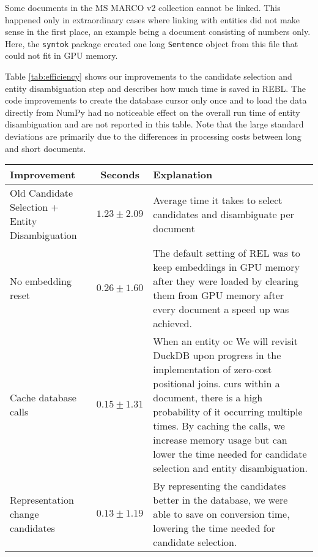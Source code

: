Some documents in the MS MARCO v2 collection cannot be linked. This happened only in extraordinary cases where linking with entities did not make sense in the first place, an example being a document consisting of numbers only. Here, the \texttt{syntok} package created one long \texttt{Sentence} object from this file that could not fit in GPU memory.

Table \ref{tab:efficiency} shows our improvements to the candidate selection and entity disambiguation step and describes how much time is saved in REBL. The code improvements to create the database cursor only once and to load the data directly from NumPy had no noticeable effect on the overall run time of entity disambiguation and are not reported in this table. Note that the large standard deviations are primarily due to the differences in processing costs between long and short documents.

\begin{sidewaystable}
	\caption{Efficiency improvements for Candidate Selection and Entity Disambiguation. Improvements are calculated over a sample of 5000 documents using a machine with an Intel Xeon Silver 4214 CPU @ 2.20GHz using two cores with 187GB RAM and a GeForce RTX 2080 Ti (11GB) GPU. Improvements are cumulative; the times shown include the previous improvement as well.}
	\label{tab:efficiency}
	\begin{tabular}{p{6cm} c p{10cm}}
		\toprule
		Improvement & Seconds & Explanation\\
		\midrule
		Old Candidate Selection + Entity Disambiguation & $1.23 \pm 2.09$ & Average time it takes to select candidates and disambiguate per document\\
		\midrule
		No embedding reset & $0.26 \pm 1.60$ & The default setting of REL was to keep embeddings in GPU memory after they were loaded by clearing them from GPU memory after every document a speed up was achieved.\\
		Cache database calls & $0.15 \pm 1.31$ & When an entity oc We will revisit DuckDB upon progress in the implementation of zero-cost positional joins.  curs within a document, there is a high probability of it occurring multiple times. By caching the calls, we increase memory usage but can lower the time needed for candidate selection and entity disambiguation.  \\
		Representation change candidates & $0.13 \pm 1.19$ & By representing the candidates better in the database, we were able to save on conversion time, lowering the time needed for candidate selection.\\
		\bottomrule
	\end{tabular}
\end{sidewaystable}

